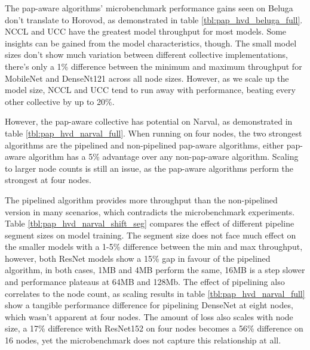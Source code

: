 

The pap-aware algorithms' microbenchmark performance gains seen on Beluga don't translate to Horovod, as demonstrated in table \ref{tbl:pap_hvd_beluga_full}.
NCCL and UCC have the greatest model throughput for most models.
Some insights can be gained from the model characteristics, though.
The small model sizes don't show much variation between different collective implementations, there's only a 1\% difference between the minimum and maximum throughput for MobileNet and DenseNt121 across all node sizes. 
However, as we scale up the model size, NCCL and UCC tend to run away with performance, beating every other collective by up to 20\%.




However, the pap-aware collective has potential on Narval, as demonstrated in table \ref{tbl:pap_hvd_narval_full}.
When running on four nodes, the two strongest algorithms are the pipelined and non-pipelined pap-aware algorithms, either pap-aware algorithm has a 5\% advantage over any non-pap-aware algorithm.
Scaling to larger node counts is still an issue, as the pap-aware algorithms perform the strongest at four nodes.

The pipelined algorithm provides more throughput than the non-pipelined version in many scenarios, which contradicts the microbenchmark experiments.
Table \ref{tbl:pap_hvd_narval_shift_seg} compares the effect of different pipeline segment sizes on model training.
The segment size does not face much effect on the smaller models with a 1-5\% difference between the min and max throughput, however, both ResNet models show a 15\% gap in favour of the pipelined algorithm, in both cases, 1MB and 4MB perform the same, 16MB is a step slower and performance plateaus at 64MB and 128Mb.
The effect of pipelining also correlates to the node count, as scaling results in table \ref{tbl:pap_hvd_narval_full} show a tangible performance difference for pipelining DenseNet at eight nodes, which wasn't apparent at four nodes.
The amount of loss also scales with node size, a 17\% difference with ResNet152 on four nodes becomes a 56\% difference on 16 nodes, yet the microbenchmark does not capture this relationship at all.

